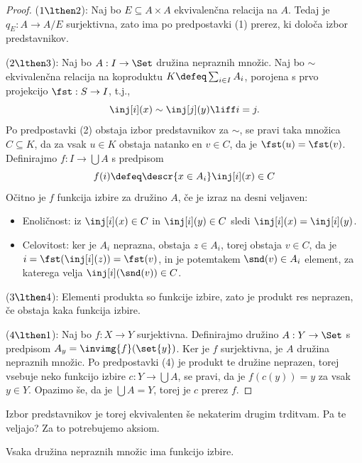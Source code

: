 \begin{proof}
  ($1 \lthen 2$):
  Naj bo $E \subseteq A \times A$ ekvivalenčna relacija na $A$. Tedaj je $q_E : A \to A/E$
  surjektivna, zato ima po predpostavki (1) prerez, ki določa izbor predstavnikov.

  ($2 \lthen 3$):
  Naj bo $A : I \to \Set$ družina nepraznih množic. Naj bo $\sim$ ekvivalenčna relacija
  na koproduktu $K \defeq \sum_{i \in I} A_i$, porojena s prvo projekcijo $\fst : S \to I$, t.j.,
  \begin{equation*}
    \inj[i](x) \sim \inj[j](y) \liff i = j.
  \end{equation*}
  Po predpostavki (2) obstaja izbor predstavnikov za $\sim$, se pravi taka množica $C \subseteq K$, da
  za vsak $u \in K$ obstaja natanko en $v \in C$, da je $\fst(u) = \fst(v)$. Definirajmo $f : I \to
  \bigcup A$ s predpisom
  \begin{equation*}
    f(i) \defeq \descr{x \in A_i} \inj[i](x) \in C
  \end{equation*}
  Očitno je $f$ funkcija izbire za družino $A$, če je izraz na desni veljaven:
  \begin{itemize}
  \item Enoličnost: iz $\inj[i](x) \in C$ in $\inj[i](y) \in C$ sledi $\inj[i](x) = \inj[i](y)$.
  \item Celovitost: ker je $A_i$ neprazna, obstaja $z \in A_i$, torej obstaja $v \in C$, da je
    $i = \fst(\inj[i](z)) = \fst(v)$, in je potemtakem $\snd(v) \in A_i$ element, za katerega velja
    $\inj[i](\snd(v)) \in C$.
  \end{itemize}

  ($3 \lthen 4$):
  Elementi produkta so funkcije izbire, zato je produkt res neprazen, če obstaja
  kaka funkcija izbire.

  ($4 \lthen 1$):
  Naj bo $f : X \to Y$ surjektivna. Definirajmo družino $A : Y \to \Set$ s
  predpisom $A_y = \invimg{f}(\set{y})$. Ker je $f$ surjektivna, je $A$ družina nepraznih
  množic. Po predpostavki (4) je produkt te družine neprazen, torej vsebuje neko
  funkcijo izbire $c : Y \to \bigcup A$, se pravi, da je $f(c(y)) = y$ za vsak $y \in Y$.
  Opazimo še, da je $\bigcup A = Y$, torej je $c$ prerez $f$.
\end{proof}

Izbor predstavnikov je torej ekvivalenten še nekaterim drugim trditvam. Pa te veljajo? Za
to potrebujemo aksiom.

\begin{aksiom}
  Vsaka družina nepraznih množic ima funkcijo izbire.
\end{aksiom}


